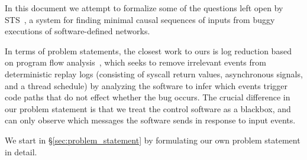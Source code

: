 In this document we attempt to formalize some of the questions left open by
STS~\cite{sts}, a system for finding minimal causal sequences of inputs from
buggy executions of software-defined networks.

In terms of problem statements, the closest work to ours is log reduction
based on program flow analysis~\cite{zhang2006dynamic,tallam2007enabling,Lee:2011:TGR:1993498.1993528},
which seeks to remove irrelevant events from deterministic replay logs
(consisting of syscall return values, asynchronous signals, and a thread
schedule) by analyzing the
software to infer which events trigger code paths that do not effect whether
the bug occurs. The crucial difference in our problem statement is that
we treat the control software as a blackbox, and
can only observe which messages the software sends in response to input events.

We start in \S\ref{sec:problem_statement} by formulating our own problem
statement in detail.
